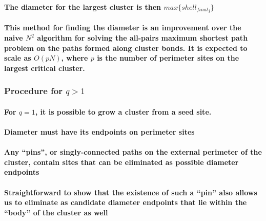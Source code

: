 \documentclass[pre,preprint]{revtex4-1}
\begin{document}
\paragraph{The diameter for the largest cluster is then $max\{{shell_{final}}_i\}$}
\label{sec-1.2.3.7}
\paragraph{This method for finding the diameter is an improvement over the naive $N^2$ algorithm for solving the all-pairs maximum shortest path problem on the paths formed along cluster bonds. It is expected to scale as $O(pN)$, where $p$ is the number of perimeter sites on the largest critical cluster.}
\label{sec-1.2.3.8}
\subsubsection{Procedure for $q>1$}
\label{sec-1.2.4}
\paragraph{For $q=1$, it is possible to grow a cluster from a seed site.}
\label{sec-1.2.4.1}
\paragraph{Diameter must have its endpoints on perimeter sites}
\label{sec-1.2.4.2}
\paragraph{Any ``pins'', or singly-connected paths on the external perimeter of the cluster, contain sites that can be eliminated as possible diameter endpoints}
\label{sec-1.2.4.3}
\paragraph{Straightforward to show that the existence of such a ``pin'' also allows us to eliminate as candidate diameter endpoints that lie within the ``body'' of the cluster as well}
\label{sec-1.2.4.4}
\end{document}

